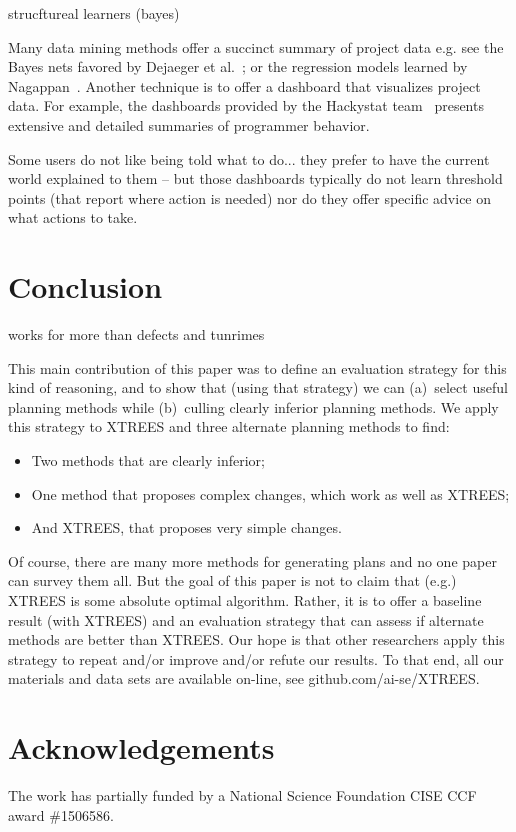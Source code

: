 \documentclass{sig-alternate}
\newcommand{\bi}{\begin{itemize}}
\newcommand{\ei}{\end{itemize}}
\begin{document}
strucftureal learners (bayes)

 

Many data mining methods offer a succinct summary of project data
e.g. see the Bayes nets
favored by Dejaeger et al.~\cite{Dejaeger13}; or   the regression models
learned by Nagappan~\cite{Nagappan05}.
Another  technique is to offer a dashboard that visualizes project data.
For example, the dashboards
provided by the Hackystat team~\cite{Johnson09} presents extensive and detailed
summaries of programmer behavior.

Some users do not like being told what to do... they prefer to have the current world explained to them 
-- but those dashboards typically do not learn threshold points
(that report where action is needed) nor do they offer specific advice on what actions to take.


\section{Conclusion}

works for more than defects and tunrimes

This main contribution of this paper was to  define an evaluation strategy for this kind of reasoning, and to show that (using that strategy) we
can (a)~select useful planning methods while (b)~culling clearly
inferior planning methods. 
We apply this strategy to XTREES and three alternate planning methods to find:
\bi
\item Two methods that are clearly inferior;
\item One method that proposes complex changes, which work as well as XTREES;
\item And XTREES, that proposes very simple changes.
\ei
Of course, there are many more methods for generating plans and
no   one paper can survey them all.
But the goal of this paper is not to claim that (e.g.) XTREES is some absolute optimal algorithm. Rather, it is
to offer a baseline result (with XTREES) and an  evaluation strategy that  can assess  if alternate methods are better than XTREES.
Our hope is that other   researchers apply this strategy  to repeat and/or improve
and/or refute our results. To that end, all our materials and data sets are available on-line, see
github.com/ai-se/XTREES.


\section*{Acknowledgements}
The work has partially funded by a National Science Foundation CISE CCF award \#1506586.



\end{document}
